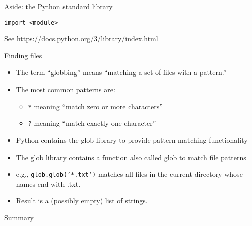 \documentclass[aspectratio=169,usenames,dvipsnames]{beamer}
\begin{document}
\begin{frame}[fragile]{Aside: the Python standard library}
\begin{lstlisting}
import <module>
\end{lstlisting}

    See \url{https://docs.python.org/3/library/index.html}
\end{frame}



\begin{frame}[fragile]{Finding files}
    \begin{itemize}
        \item The term ``globbing'' means ``matching a set of files with a pattern.''
        \item The most common patterns are:
            \begin{itemize}
                \item \texttt{*} meaning ``match zero or more characters''
                \item \texttt{?} meaning ``match exactly one character''
            \end{itemize}
        \item Python contains the glob library to provide pattern matching functionality
        \item The glob library contains a function also called glob to match
            file patterns
        \item e.g., \texttt{glob.glob('*.txt')} matches all files in the
            current directory whose names end with .txt.
        \item Result is a (possibly empty) list of strings.
    \end{itemize}
\end{frame}

\begin{frame}{Summary}
\end{frame}
\end{document}
